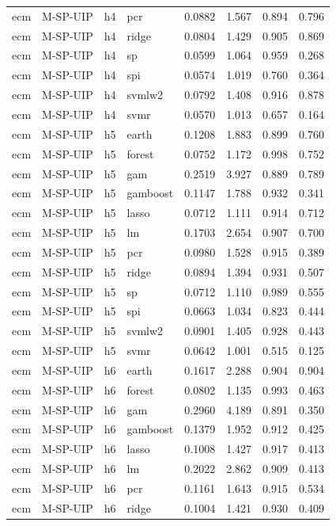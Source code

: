 \begin{ThreePartTable}
\begin{longtable}[t]{llclcccc}
ecm & M-SP-UIP & h4 & pcr & 0.0882 & 1.567 & 0.894 & 0.796\\
ecm & M-SP-UIP & h4 & ridge & 0.0804 & 1.429 & 0.905 & 0.869\\
ecm & M-SP-UIP & h4 & sp & 0.0599 & 1.064 & 0.959 & 0.268\\
ecm & M-SP-UIP & h4 & spi & 0.0574 & 1.019 & 0.760 & 0.364\\
ecm & M-SP-UIP & h4 & svmlw2 & 0.0792 & 1.408 & 0.916 & 0.878\\
ecm & M-SP-UIP & h4 & svmr & 0.0570 & 1.013 & 0.657 & 0.164\\
\addlinespace
ecm & M-SP-UIP & h5 & earth & 0.1208 & 1.883 & 0.899 & 0.760\\
ecm & M-SP-UIP & h5 & forest & 0.0752 & 1.172 & 0.998 & 0.752\\
ecm & M-SP-UIP & h5 & gam & 0.2519 & 3.927 & 0.889 & 0.789\\
ecm & M-SP-UIP & h5 & gamboost & 0.1147 & 1.788 & 0.932 & 0.341\\
ecm & M-SP-UIP & h5 & lasso & 0.0712 & 1.111 & 0.914 & 0.712\\
ecm & M-SP-UIP & h5 & lm & 0.1703 & 2.654 & 0.907 & 0.700\\
ecm & M-SP-UIP & h5 & pcr & 0.0980 & 1.528 & 0.915 & 0.389\\
ecm & M-SP-UIP & h5 & ridge & 0.0894 & 1.394 & 0.931 & 0.507\\
ecm & M-SP-UIP & h5 & sp & 0.0712 & 1.110 & 0.989 & 0.555\\
ecm & M-SP-UIP & h5 & spi & 0.0663 & 1.034 & 0.823 & 0.444\\
ecm & M-SP-UIP & h5 & svmlw2 & 0.0901 & 1.405 & 0.928 & 0.443\\
ecm & M-SP-UIP & h5 & svmr & 0.0642 & 1.001 & 0.515 & 0.125\\
\addlinespace
ecm & M-SP-UIP & h6 & earth & 0.1617 & 2.288 & 0.904 & 0.904\\
ecm & M-SP-UIP & h6 & forest & 0.0802 & 1.135 & 0.993 & 0.463\\
ecm & M-SP-UIP & h6 & gam & 0.2960 & 4.189 & 0.891 & 0.350\\
ecm & M-SP-UIP & h6 & gamboost & 0.1379 & 1.952 & 0.912 & 0.425\\
ecm & M-SP-UIP & h6 & lasso & 0.1008 & 1.427 & 0.917 & 0.413\\
ecm & M-SP-UIP & h6 & lm & 0.2022 & 2.862 & 0.909 & 0.413\\
ecm & M-SP-UIP & h6 & pcr & 0.1161 & 1.643 & 0.915 & 0.534\\
ecm & M-SP-UIP & h6 & ridge & 0.1004 & 1.421 & 0.930 & 0.409\\

\end{longtable}
\end{ThreePartTable}
